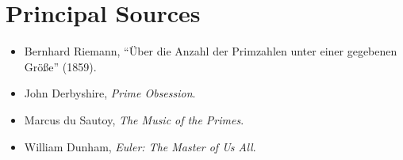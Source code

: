 \documentclass[11pt]{article}
\begin{document}


\section*{Principal Sources}
\begin{itemize}[nosep]
\item Bernhard Riemann, ``\"Uber die Anzahl der Primzahlen unter einer gegebenen Gr\"o{\ss}e'' (1859).
\item John Derbyshire, \emph{Prime Obsession}.
\item Marcus du Sautoy, \emph{The Music of the Primes}.
\item William Dunham, \emph{Euler: The Master of Us All}.
\end{itemize}

\end{document}
